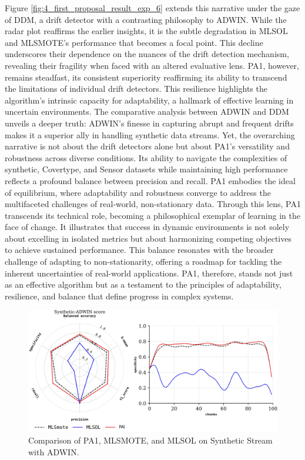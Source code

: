 Figure \ref{fig:4_first_proposal_result_exp_6} extends this narrative under the gaze of DDM, a drift detector with a contrasting philosophy to ADWIN. While the radar plot reaffirms the earlier insights, it is the subtle degradation in MLSOL and MLSMOTE’s performance that becomes a focal point. This decline underscores their dependence on the nuances of the drift detection mechanism, revealing their fragility when faced with an altered evaluative lens. PA1, however, remains steadfast, its consistent superiority reaffirming its ability to transcend the limitations of individual drift detectors. This resilience highlights the algorithm's intrinsic capacity for adaptability, a hallmark of effective learning in uncertain environments. The comparative analysis between ADWIN and DDM unveils a deeper truth: ADWIN’s finesse in capturing abrupt and frequent drifts makes it a superior ally in handling synthetic data streams. Yet, the overarching narrative is not about the drift detectors alone but about PA1’s versatility and robustness across diverse conditions. Its ability to navigate the complexities of synthetic, Covertype, and Sensor datasets while maintaining high performance reflects a profound balance between precision and recall. PA1 embodies the ideal of equilibrium, where adaptability and robustness converge to address the multifaceted challenges of real-world, non-stationary data. Through this lens, PA1 transcends its technical role, becoming a philosophical exemplar of learning in the face of change. It illustrates that success in dynamic environments is not solely about excelling in isolated metrics but about harmonizing competing objectives to achieve sustained performance. This balance resonates with the broader challenge of adapting to non-stationarity, offering a roadmap for tackling the inherent uncertainties of real-world applications. PA1, therefore, stands not just as an effective algorithm but as a testament to the principles of adaptability, resilience, and balance that define progress in complex systems.

\begin{figure}[H]
	\centering
	\includegraphics[width=0.8\linewidth]{4_Imbalanced/figures/exp_5.png}
  \caption{Comparison of PA1, MLSMOTE, and MLSOL on Synthetic Stream with ADWIN.}
	\label{fig:4_first_proposal_result_exp_5}
\end{figure}

